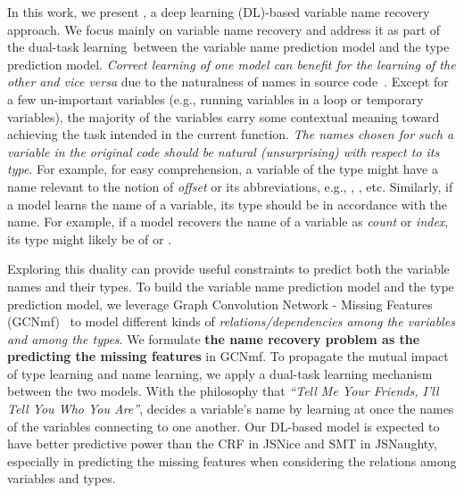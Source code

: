 


In this work, we present {\tool}, a deep learning (DL)-based variable
name recovery approach. We focus mainly on variable name recovery and
address it as part of the dual-task learning~between the variable name
prediction model and the type prediction model. {\em Correct learning
  of one model can benefit for the learning of the other and vice
  versa} due to the naturalness of names in source
code~\cite{hindle-icse12}.
%
Except for a few un-important variables (e.g., running variables in a
loop or temporary variables), the majority of the variables carry some
contextual meaning toward achieving the task intended in the current
function.
%
{\em The names chosen for such a variable in the original code should
  be natural (unsurprising) with respect to its type}.
For example, for easy comprehension, a variable of the type
 might have a name relevant to the notion of {\em offset}
or its abbreviations, e.g., , , etc.
Similarly, if a model learns the name of a variable, its type should
be in accordance with the name. For example, if a model recovers the
name of a variable as {\em count} or {\em index}, its type might
likely be of  or .

%

Exploring this duality can provide useful constraints to predict both
the variable names and their types.  To build the variable name
prediction model and the type prediction model, we leverage Graph
Convolution Network - Missing Features (GCNmf)~\cite{GCNmf} to model
different kinds of {\em relations/dependencies among the variables and
  among the types}. We formulate {\bf the name recovery problem as the
  predicting the missing features} in GCNmf. To propagate the mutual
impact of type learning and name learning, we apply a dual-task
learning mechanism between the two models.
%
With the philosophy that {\em ``Tell Me Your Friends, I'll Tell You Who
  You Are''}, {\tool} decides a variable's name by learning at once
the names of the variables connecting to one another.
%
Our DL-based model is expected to have better predictive power than
the CRF in JSNice and SMT in JSNaughty, especially in predicting the
missing features when considering the relations among variables and
types.

